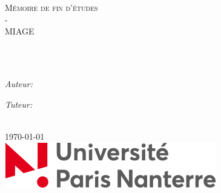 \documentclass[
12pt, %
french, %
singlespacing, %
headsepline, %
]{MastersDoctoralThesis} %
\author{Valentin \textsc{Bouquet}} %
\begin{document}

\frontmatter %

\pagestyle{plain} %


\begin{titlepage}
\begin{center}

\vspace*{.06\textheight}
{\scshape\LARGE \univname \par}\vspace{1.5cm} %
\textsc{\Large Mémoire de fin d'études\\-\\MIAGE}\\[0.5cm] %

\HRule \\[0.4cm] %
{\huge \bfseries \ttitle\par}\vspace{0.4cm} %
\HRule \\[1.5cm] %
 
\begin{minipage}[t]{0.4\textwidth}
\begin{flushleft} \large
\emph{Auteur:}\\
\href{http://www.github.com/vbouquet}{\authorname} %
\end{flushleft}
\end{minipage}
\begin{minipage}[t]{0.4\textwidth}
\begin{flushright} \large
\emph{Tuteur:} \\
\href{https://www.lip6.fr/actualite/personnes-fiche.php?ident=P216}{\supname} %
\end{flushright}
\end{minipage}\\[3cm]
 


{\large \today}\\[4cm] %
\includegraphics[scale=0.75]{figures/logo-paris-nanterre.jpg} %
 
\vfill
\end{center}
\end{titlepage}
\end{document}
